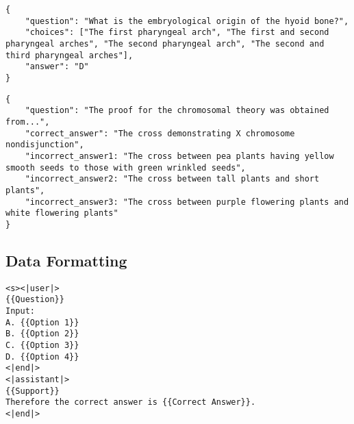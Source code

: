 \begin{lstlisting}[caption=MMLU (Anatomy) Data Example]
{
    "question": "What is the embryological origin of the hyoid bone?",
    "choices": ["The first pharyngeal arch", "The first and second pharyngeal arches", "The second pharyngeal arch", "The second and third pharyngeal arches"],
    "answer": "D"
}
\end{lstlisting}

\begin{lstlisting}[caption=GPQA Data Example]
{
    "question": "The proof for the chromosomal theory was obtained from...",
    "correct_answer": "The cross demonstrating X chromosome nondisjunction",
    "incorrect_answer1: "The cross between pea plants having yellow smooth seeds to those with green wrinkled seeds",
    "incorrect_answer2: "The cross between tall plants and short plants",
    "incorrect_answer3: "The cross between purple flowering plants and white flowering plants"
}
\end{lstlisting}

\subsection{Data Formatting}
\label{subsec:data-formatting}

\begin{lstlisting}[caption=MCQ Formatting]
<s><|user|>
{{Question}}
Input:
A. {{Option 1}}
B. {{Option 2}}
C. {{Option 3}}
D. {{Option 4}}
<|end|>
<|assistant|>
{{Support}}
Therefore the correct answer is {{Correct Answer}}.
<|end|>
\end{lstlisting}